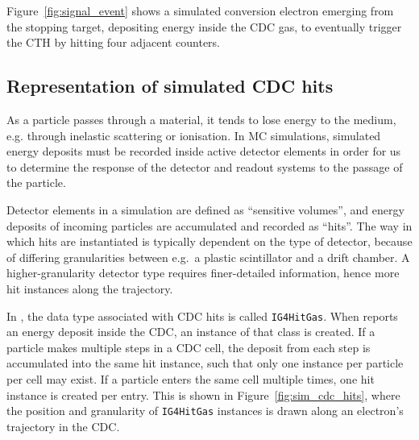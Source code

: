 Figure~\ref{fig:signal_event} shows a simulated conversion electron emerging from the stopping target, depositing energy inside the CDC gas, to eventually trigger the CTH by hitting four adjacent counters. 

\subsection{Representation of simulated CDC hits}
\label{subsec:SD}
As a particle passes through a material, it tends to lose energy to the medium, e.g. through inelastic scattering or ionisation. 
In MC simulations, simulated energy deposits must be recorded inside active detector elements in order for us to determine the response of the detector and readout systems to the passage of the particle.

Detector elements in a \Geant simulation are defined as ``sensitive volumes'', and energy deposits of incoming particles are accumulated and recorded as ``hits''. 
The way in which hits are instantiated is typically dependent on the type of detector, because of differing granularities between e.g.\ a plastic scintillator and a drift chamber. A higher-granularity detector type requires finer-detailed information, hence more hit instances along the trajectory.

In \SimG, the data type associated with CDC hits is called \texttt{IG4HitGas}. When \Geant reports an energy deposit inside the CDC, an instance of that class is created. If a particle makes multiple steps in a CDC cell, the deposit from each step is accumulated into the same hit instance, such that only one instance per particle per cell may exist. If a particle enters the same cell multiple times, one hit instance is created per entry.
This is shown in Figure~\ref{fig:sim_cdc_hits}, where the position and granularity of \texttt{IG4HitGas} instances is drawn along an electron's trajectory in the CDC.





